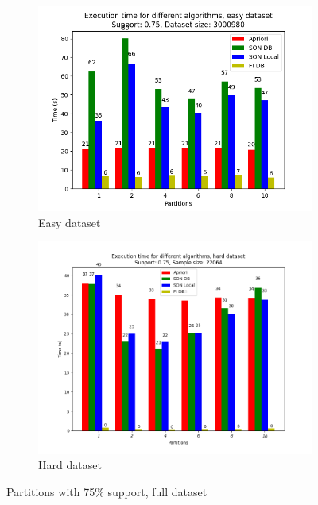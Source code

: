 \documentclass[a4paper]{article}
\begin{document}
	
	
	
	\begin{figure}[h]
		\centering
		\begin{subfigure}[b]{\textwidth}
			\centering
			\includegraphics[width=\textwidth]{1_easy_0,75_1_partitions.png}
         	\caption{Easy dataset}
         	\label{fig:075sup-e}
		\end{subfigure}
		\hfill		
		\begin{subfigure}[b]{\textwidth}
			\centering
			\includegraphics[width=\textwidth]{1_hard_0,75_1_partitions.png}
         	\caption{Hard dataset}
         	\label{fig:075sup-h}
		\end{subfigure}
		\hfill
		
		\caption{Partitions with 75\% support, full dataset}
		\label{fig:075sup}
	\end{figure}
	
\end{document}
